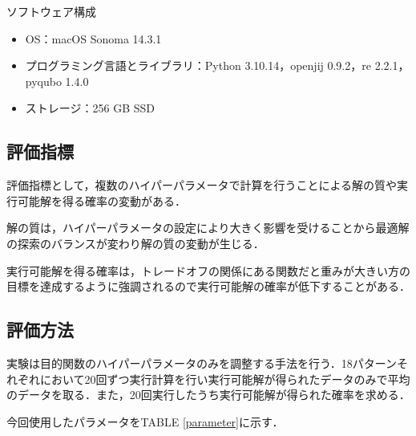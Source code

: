 \documentclass[conference]{IEEEtran}
\begin{document}
\vspace{\baselineskip}

ソフトウェア構成 
\begin{itemize}
\item OS：macOS Sonoma 14.3.1
\item プログラミング言語とライブラリ：Python 3.10.14，openjij 0.9.2，re 2.2.1，pyqubo 1.4.0
\item ストレージ：256 GB SSD
\end{itemize}

\subsection{評価指標}
評価指標として，複数のハイパーパラメータで計算を行うことによる解の質や実行可能解を得る確率の変動がある．

解の質は，ハイパーパラメータの設定により大きく影響を受けることから最適解の探索のバランスが変わり解の質の変動が生じる．

実行可能解を得る確率は，トレードオフの関係にある関数だと重みが大きい方の目標を達成するように強調されるので実行可能解の確率が低下することがある．
\subsection{評価方法}
実験は目的関数のハイパーパラメータのみを調整する手法を行う．18パターンそれぞれにおいて20回ずつ実行計算を行い実行可能解が得られたデータのみで平均のデータを取る．また，20回実行したうち実行可能解が得られた確率を求める．

今回使用したパラメータをTABLE \ref{parameter}に示す．
\end{document}
